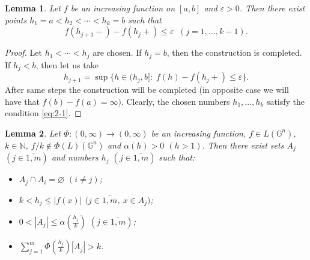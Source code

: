 \documentclass[12pt,reqno]{article}
\newtheorem{lemma}{Lemma}
\theoremstyle{remark}
\begin{document}
\begin{lemma}\label{lem:2}
Let $f$ be an increasing function on $[a,b]$ and $\varepsilon>0$. Then there exist points $h_1=a<h_2<\cdots<h_k=b$ such that
\begin{equation}\label{eq:2-1}
    f(h_{j+1}-)-f(h_j+)\leq\varepsilon \;\; (j=1,\dots,k-1).
\end{equation}
\end{lemma}

\begin{proof}
Let $h_1<\cdots<h_j$ are chosen. If $h_j=b$, then the construction is completed. If $h_j<b$, then let us take
$$  h_{j+1}=\sup\Big\{h\in (h_j,b]:\;f(h)-f(h_j+)\leq\varepsilon\Big\}.       $$
After same steps the construction will be completed (in opposite case we will have that $f(b)-f(a)=\infty)$. Clearly, the chosen numbers $h_1,\dots,h_k$ satisfy the condition \eqref{eq:2-1}.
\end{proof}

\begin{lemma}\label{lem:3}
Let $\Phi: (0,\infty)\rightarrow (0,\infty)$  be an increasing function, $f\in L(\mathbb{G}^n)$, $k\in\mathbb{N}$, $f/k\not\in\Phi(L)(\mathbb{G}^n)$ and $\alpha(h)>0$ $(h>1)$. Then there exist sets $A_j$ $(j\in\overline{1,m})$ and numbers $h_j$ $(j\in\overline{1,m})$ such that:
\begin{itemize}
\item[$1)$] $A_j\cap A_i=\varnothing$ $(i\neq j)$;

\item[$2)$] $k<h_j\leq|f(x)|$ $(j\in\overline{1,m}$, $x\in A_j)$;

\item[$3)$] $0<|A_j|\leq\alpha(\frac{h_j}{k})$ $(j\in\overline{1,m})$;

\item[$4)$] $\sum\limits_{j=1}^m \Phi(\frac{h_j}{k})|A_j|>k$.
\end{itemize}
\end{lemma}
\end{document}
